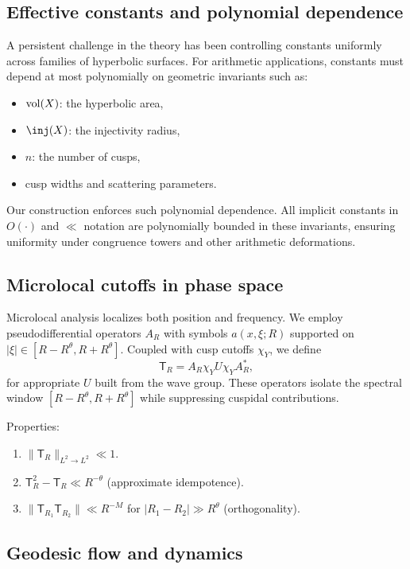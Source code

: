 \subsection{Effective constants and polynomial dependence}\label{subsec:constants}

A persistent challenge in the theory has been controlling constants uniformly across families of hyperbolic surfaces. For arithmetic applications, constants must depend at most polynomially on geometric invariants such as:

\begin{itemize}
  \item $\operatorname{vol}(X)$: the hyperbolic area,
  \item $\inj(X)$: the injectivity radius,
  \item $n$: the number of cusps,
  \item cusp widths and scattering parameters.
\end{itemize}

Our construction enforces such polynomial dependence. All implicit constants in $O(\cdot)$ and $\ll$ notation are polynomially bounded in these invariants, ensuring uniformity under congruence towers and other arithmetic deformations.

\subsection{Microlocal cutoffs in phase space}\label{subsec:cutoffs}

Microlocal analysis localizes both position and frequency. We employ pseudodifferential operators $A_R$ with symbols $a(x,\xi;R)$ supported on $|\xi|\in [R-R^\theta,R+R^\theta]$. Coupled with cusp cutoffs $\chi_Y$, we define
\[
\mathsf{T}_R = A_R \chi_Y U \chi_Y A_R^*,
\]
for appropriate $U$ built from the wave group. These operators isolate the spectral window $[R-R^\theta,R+R^\theta]$ while suppressing cuspidal contributions.

Properties:
\begin{enumerate}
  \item $\|\mathsf{T}_R\|_{L^2\to L^2} \ll 1$.
  \item $\mathsf{T}_R^2 - \mathsf{T}_R \ll R^{-\theta}$ (approximate idempotence).
  \item $\|\mathsf{T}_{R_1}\mathsf{T}_{R_2}\| \ll R^{-M}$ for $|R_1-R_2|\gg R^\theta$ (orthogonality).
\end{enumerate}

\subsection{Geodesic flow and dynamics}\label{subsec:flow}

